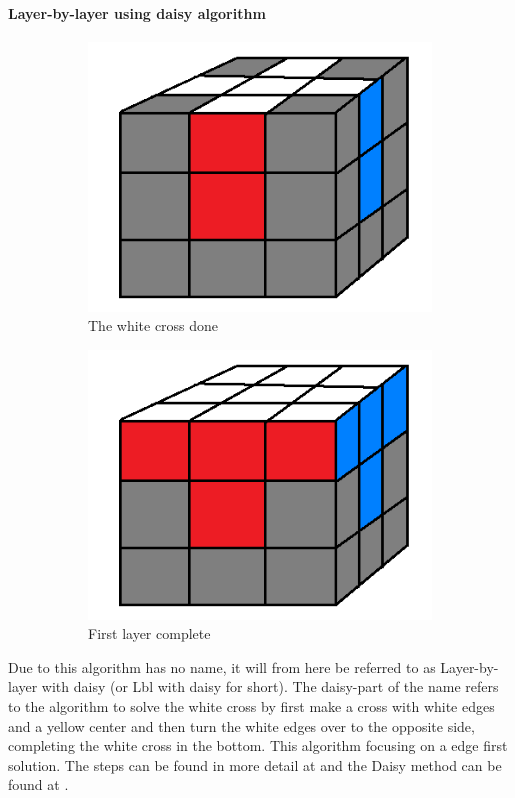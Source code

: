 \documentclass[a4paper,11pt]{kth-mag}
\begin{document}
\paragraph{Layer-by-layer using daisy algorithm}
\begin{figure}[b]
	\centering
	\begin{subfigure}[!b]{0.3\textwidth}
		\includegraphics[width=\textwidth]{figs/step1.png}
		\caption{The white cross done}
		\label{fig_4}
	\end{subfigure}
	\begin{subfigure}[!b]{0.3\textwidth}
		\includegraphics[width=\textwidth]{figs/step2.png}
		\caption{First layer complete}
		\label{fig_5}
	\end{subfigure}
	\caption{}
\end{figure}
Due to this algorithm has no name, it will from here be referred to as Layer-by-layer with daisy (or Lbl with daisy for short). The daisy-part of the name refers to the algorithm to solve the white cross by first make a cross with white edges and a yellow center and then turn the white edges over to the opposite side, completing the white cross in the bottom. This algorithm focusing on a edge first solution. The steps can be found in more detail at  \cite{Lee-Mao-Harris} and the Daisy method can be found at \cite{Shellie}. 
\end{document}

